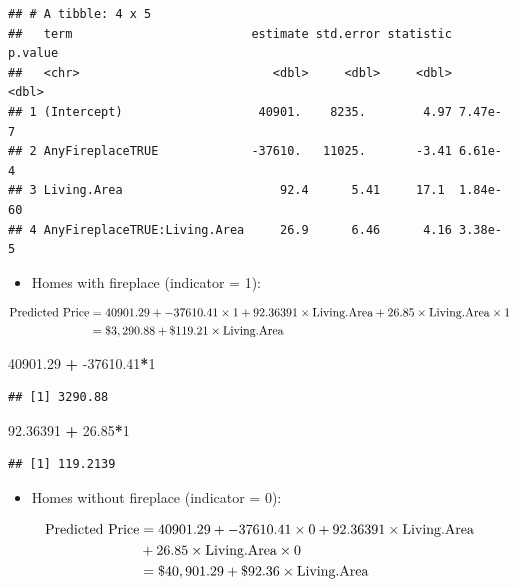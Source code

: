 \documentclass[
]{book}
\newenvironment{Shaded}{\begin{snugshade}}{\end{snugshade}}
\newcommand{\DecValTok}[1]{\textcolor[rgb]{0.00,0.00,0.81}{#1}}
\newcommand{\FloatTok}[1]{\textcolor[rgb]{0.00,0.00,0.81}{#1}}
\newcommand{\OperatorTok}[1]{\textcolor[rgb]{0.81,0.36,0.00}{\textbf{#1}}}
\newcommand{\StringTok}[1]{\textcolor[rgb]{0.31,0.60,0.02}{#1}}
\providecommand{\tightlist}{%
  \setlength{\itemsep}{0pt}\setlength{\parskip}{0pt}}
\begin{document}
\begin{verbatim}
## # A tibble: 4 x 5
##   term                         estimate std.error statistic  p.value
##   <chr>                           <dbl>     <dbl>     <dbl>    <dbl>
## 1 (Intercept)                   40901.    8235.        4.97 7.47e- 7
## 2 AnyFireplaceTRUE             -37610.   11025.       -3.41 6.61e- 4
## 3 Living.Area                      92.4      5.41     17.1  1.84e-60
## 4 AnyFireplaceTRUE:Living.Area     26.9      6.46      4.16 3.38e- 5
\end{verbatim}

\begin{itemize}
\tightlist
\item
  Homes with fireplace (indicator = 1):
\end{itemize}

\begin{align*}
\hbox{Predicted Price} &= 40901.29 + -37610.41 \times 1 + 92.36391 \times \hbox{Living.Area} + 26.85 \times \hbox{Living.Area} \times 1 \\
& = \$3,290.88 + \$119.21 \times \hbox{Living.Area}
\end{align*}

\begin{Shaded}
\begin{Highlighting}[]
\FloatTok{40901.29} \OperatorTok{+}\StringTok{ }\FloatTok{-37610.41}\OperatorTok{*}\DecValTok{1}
\end{Highlighting}
\end{Shaded}

\begin{verbatim}
## [1] 3290.88
\end{verbatim}

\begin{Shaded}
\begin{Highlighting}[]
\FloatTok{92.36391} \OperatorTok{+}\StringTok{ }\FloatTok{26.85}\OperatorTok{*}\DecValTok{1}
\end{Highlighting}
\end{Shaded}

\begin{verbatim}
## [1] 119.2139
\end{verbatim}

\begin{itemize}
\tightlist
\item
  Homes without fireplace (indicator = 0):
\end{itemize}

\begin{align*}
\hbox{Predicted Price} &= 40901.29 + -37610.41 \times 0 + 92.36391 \times \hbox{Living.Area}\\
&+ 26.85 \times \hbox{Living.Area} \times 0 \\
&= \$40,901.29 + \$92.36 \times \hbox{Living.Area}
\end{align*}
\end{document}
